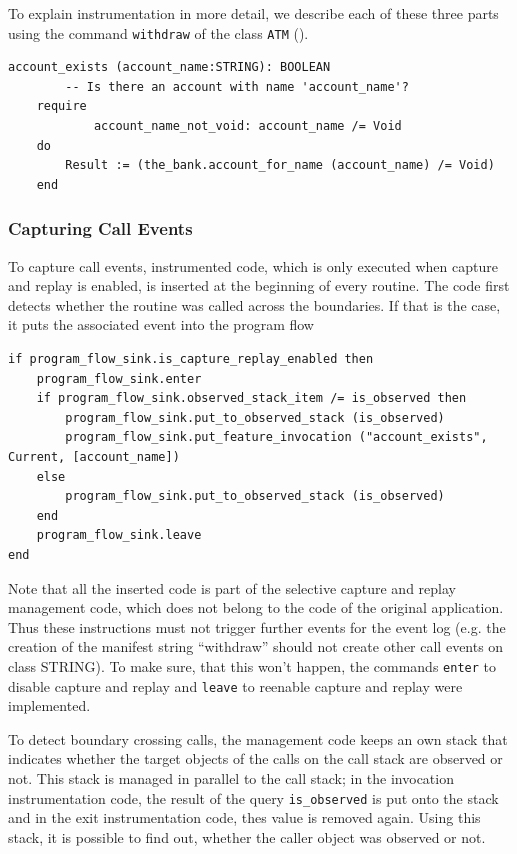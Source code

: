 To explain instrumentation in more detail, we describe each of these three parts using the command \texttt{withdraw} of the class \texttt{ATM} ().

\begin{lstlisting}[caption=Original Code of Command \texttt{withdraw} ,label=lst:account_exists_original]
account_exists (account_name:STRING): BOOLEAN
		-- Is there an account with name 'account_name'?
	require
			account_name_not_void: account_name /= Void
	do
		Result := (the_bank.account_for_name (account_name) /= Void)
	end
\end{lstlisting}

\subsubsection{Capturing Call Events}
To capture call events, instrumented code, which is only executed when capture and replay is enabled, is inserted at the beginning of every routine. The code first detects whether the routine was called across the boundaries. If that is the case, it puts the associated event into the program flow 
\begin{lstlisting}[caption=Instrumentation Code to Detect Call Events,label=lst:invocation_instrumentation]
if program_flow_sink.is_capture_replay_enabled then
	program_flow_sink.enter
	if program_flow_sink.observed_stack_item /= is_observed then
		program_flow_sink.put_to_observed_stack (is_observed)
		program_flow_sink.put_feature_invocation ("account_exists", Current, [account_name])
	else
		program_flow_sink.put_to_observed_stack (is_observed)
	end
	program_flow_sink.leave
end
\end{lstlisting}
Note that all the inserted code is part of the selective capture and replay management code, which does not belong to the code of the original application. Thus these instructions must not trigger further events for the event log (e.g. the creation of the manifest string ``withdraw'' should not create other call events on class STRING). To make sure, that this won't happen, the commands \texttt{enter} to disable capture and replay and \texttt{leave} to reenable capture and replay were implemented.

To detect boundary crossing calls, the management code keeps an own stack that indicates whether the target objects of the calls on the call stack are observed or not. This stack is managed in parallel to the call stack; in the invocation instrumentation code, the result of the query \texttt{is\_observed} is put onto the stack and in the exit instrumentation code, thes value is removed again. Using this stack, it is possible to find out, whether the caller object was observed or not.
